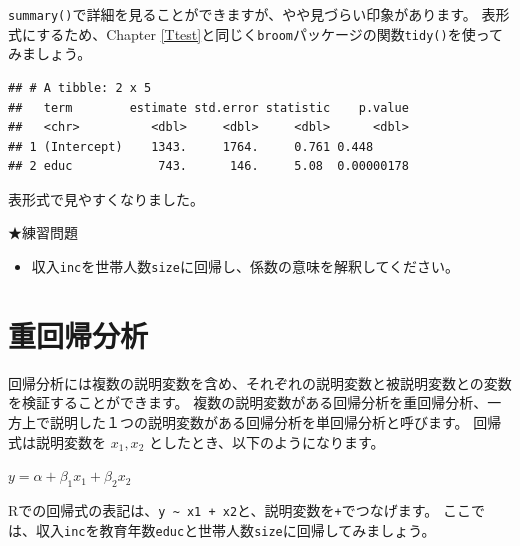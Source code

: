 \documentclass[]{book}
\newenvironment{Shaded}{\begin{snugshade}}{\end{snugshade}}
\newcommand{\KeywordTok}[1]{\textcolor[rgb]{0.13,0.29,0.53}{\textbf{#1}}}
\newcommand{\DataTypeTok}[1]{\textcolor[rgb]{0.13,0.29,0.53}{#1}}
\newcommand{\StringTok}[1]{\textcolor[rgb]{0.31,0.60,0.02}{#1}}
\newcommand{\OperatorTok}[1]{\textcolor[rgb]{0.81,0.36,0.00}{\textbf{#1}}}
\newcommand{\NormalTok}[1]{#1}
\providecommand{\tightlist}{%
  \setlength{\itemsep}{0pt}\setlength{\parskip}{0pt}}
\begin{document}
\texttt{summary()}で詳細を見ることができますが、やや見づらい印象があります。
表形式にするため、Chapter
\ref{Ttest}と同じく\texttt{broom}パッケージの関数\texttt{tidy()}を使ってみましょう。

\begin{Shaded}
\end{Shaded}

\begin{verbatim}
## # A tibble: 2 x 5
##   term        estimate std.error statistic    p.value
##   <chr>          <dbl>     <dbl>     <dbl>      <dbl>
## 1 (Intercept)    1343.     1764.     0.761 0.448     
## 2 educ            743.      146.     5.08  0.00000178
\end{verbatim}

表形式で見やすくなりました。

★練習問題

\begin{itemize}
\tightlist
\item
  収入\texttt{inc}を世帯人数\texttt{size}に回帰し、係数の意味を解釈してください。
\end{itemize}

\section{重回帰分析}\label{ux91cdux56deux5e30ux5206ux6790}

回帰分析には複数の説明変数を含め、それぞれの説明変数と被説明変数との変数を検証することができます。
複数の説明変数がある回帰分析を重回帰分析、一方上で説明した１つの説明変数がある回帰分析を単回帰分析と呼びます。
回帰式は説明変数を \(x_1, x_2\) としたとき、以下のようになります。

\(y = \alpha + \beta_1 x_1 + \beta_2 x_2\)

Rでの回帰式の表記は、\texttt{y\ \textasciitilde{}\ x1\ +\ x2}と、説明変数を\texttt{+}でつなげます。
ここでは、収入\texttt{inc}を教育年数\texttt{educ}と世帯人数\texttt{size}に回帰してみましょう。

\begin{Shaded}
\end{Shaded}
\end{document}
